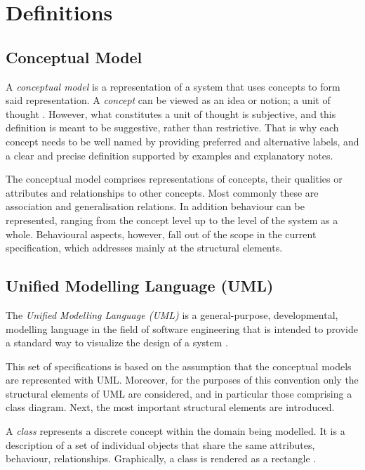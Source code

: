 \section{Definitions}
	\label{sec:definitions}

\subsection{Conceptual Model}
	\label{sec:cm}
	
	A \textit{conceptual model} is a representation of a system that uses concepts to form said representation. A \textit{concept} can be viewed as an idea or notion; a unit of thought \cite{skos-spec}. However, what constitutes a unit of thought is subjective, and this definition is meant to be suggestive, rather than restrictive. That is why each concept needs to be well named by providing preferred and alternative labels, and a clear and precise definition supported by examples and explanatory notes.
	
	The conceptual model comprises representations of concepts, their qualities or attributes and relationships to other concepts. Most commonly these are association and generalisation relations. In addition behaviour can be represented, ranging from the concept level up to the level of the system as a whole. Behavioural aspects, however, fall out of the scope in the current specification, which addresses mainly at the structural elements.

\subsection{Unified Modelling Language (UML)}
	\label{sec:uml}
	
	The \textit{Unified Modelling Language (UML)} is a general-purpose, developmental, modelling language in the field of software engineering that is intended to provide a standard way to visualize the design of a system \cite{uml-userguide}.
	
	This set of specifications is based on the assumption that the conceptual models are represented with UML. Moreover, for the purposes of this convention only the structural elements of UML are considered, and in particular those comprising a class diagram. Next, the most important structural elements are introduced.
	
	A \textit{class} represents a discrete concept within the domain being modelled. It is a description of a set of individual objects that share the same attributes, behaviour, relationships. Graphically, a class is rendered as a rectangle \cite{uml-userguide}.
	
